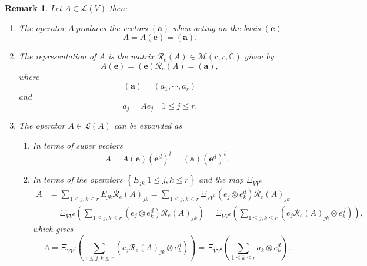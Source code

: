 \documentclass[aps,preprint]{revtex4}%
\newtheorem{remark}[theorem]{Remark}
\begin{document}
\begin{remark}
Let $A\in\mathcal{L}\left(  V\right)  $ then:

\begin{enumerate}
\item The operator $A\ $produces the vectors $\left(  \mathbf{a}\right)  $
when acting on the basis $\left(  \mathbf{e}\right)  $
\begin{equation}
A=A\left(  \mathbf{e}\right)  =\left(  \mathbf{a}\right)  .
\end{equation}


\item The representation of $A$ is the matrix $\mathcal{R}_{e}\left(
A\right)  \in\mathcal{M}\left(  r,r,\mathbb{C}\right)  $ given by
\begin{equation}
A\left(  \mathbf{e}\right)  =\left(  \mathbf{e}\right)  \mathcal{R}_{e}\left(
A\right)  =\left(  \mathbf{a}\right)  ,
\end{equation}
where
\begin{equation}
\left(  \mathbf{a}\right)  =\left(  a_{1},\cdots,a_{r}\right)
\end{equation}
and
\begin{equation}
a_{j}=Ae_{j}\quad1\leq j\leq r.
\end{equation}


\item The operator $A\in\mathcal{L}\left(  A\right)  $ can be expanded as

\begin{enumerate}
\item In terms of super vectors
\begin{equation}
A=A\left(  \mathbf{e}\right)  \left(  \mathbf{e}^{d}\right)  ^{t}=\left(
\mathbf{a}\right)  \left(  \mathbf{e}^{d}\right)  ^{t}.
\end{equation}


\item In terms of the operators $\left\{  \left.  E_{jk}\right\vert 1\leq
j,k\leq r\right\}  $ and the map $\Xi_{VV^{d}}$
\begin{align}
A  &  =\sum_{1\leq j,k\leq r}E_{jk}\mathcal{R}_{e}\left(  A\right)  _{jk}%
=\sum_{1\leq j,k\leq r}\Xi_{VV^{d}}\left(  e_{j}\otimes e_{k}^{d}\right)
\mathcal{R}_{e}\left(  A\right)  _{jk}\\
&  =\Xi_{VV^{d}}\left(  \sum_{1\leq j,k\leq r}\left(  e_{j}\otimes e_{k}%
^{d}\right)  \mathcal{R}_{e}\left(  A\right)  _{jk}\right)  =\Xi_{VV^{d}%
}\left(  \sum_{1\leq j,k\leq r}\left(  e_{j}\mathcal{R}_{e}\left(  A\right)
_{jk}\otimes e_{k}^{d}\right)  \right)  ,
\end{align}
which gives
\begin{equation}
A=\Xi_{VV^{d}}\left(  \sum_{1\leq j,k\leq r}\left(  e_{j}\mathcal{R}%
_{e}\left(  A\right)  _{jk}\otimes e_{k}^{d}\right)  \right)  =\Xi_{VV^{d}%
}\left(  \sum_{1\leq k\leq r}a_{k}\otimes e_{k}^{d}\right)  .
\end{equation}



\end{enumerate}
\end{enumerate}
\end{remark}
\end{document}
